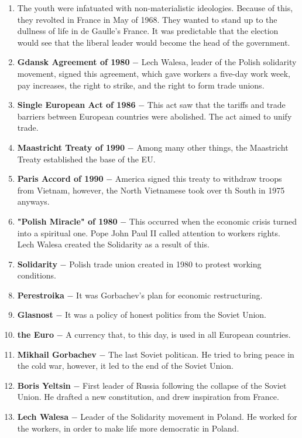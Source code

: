 \documentclass[12pt]{article}
\begin{document}
\begin{flushleft}
\begin{enumerate}
    \item The youth were infatuated with non-materialistic ideologies. Because of this, they revolted in France in May of 1968. They wanted  to stand up to the dullness of life in de Gaulle's France. It was predictable that the election would see that the liberal leader would become the head of the government.

    \item \textbf{Gdansk Agreement of 1980} $-$ Lech Walesa, leader of the Polish solidarity movement, signed this agreement, which gave workers a five-day work week, pay increases, the right to strike, and the right to form trade unions.

    \item \textbf{Single European Act of 1986} $-$ This act saw that the tariffs and trade barriers between European countries were abolished. The act aimed to unify trade. 

    \item \textbf{Maastricht Treaty of 1990} $-$ Among many other things, the Maastricht Treaty established the base of the EU.

    \item \textbf{Paris Accord of 1990} $-$ America signed this treaty to withdraw troops from Vietnam, however, the North Vietnamese took over th South in 1975 anyways.

    \item \textbf{"Polish Miracle" of 1980} $-$ This occurred when the economic crisis turned into a spiritual one. Pope John Paul II called attention to workers rights. Lech Walesa created the Solidarity as a result of this.

    \item \textbf{Solidarity} $-$ Polish trade union created in 1980 to protest working conditions. 

    \item \textbf{Perestroika} $-$ It was Gorbachev's plan for economic restructuring.

    \item \textbf{Glasnost} $-$ It was a policy of honest politics from the Soviet Union.

    \item \textbf{the Euro} $-$ A currency that, to this day, is used in all European countries.

    \item \textbf{Mikhail Gorbachev} $-$ The last Soviet politican. He tried to bring peace in the cold war, however, it led to the end of the Soviet Union. 

    \item \textbf{Boris Yeltsin} $-$ First leader of Russia following the collapse of the Soviet Union. He drafted a new constitution, and drew inspiration from France.

    \item \textbf{Lech Walesa} $-$ Leader of the Solidarity movement in Poland. He worked for the workers, in order to make life more democratic in Poland. 

\end{enumerate}
\end{flushleft}
\end{document}
